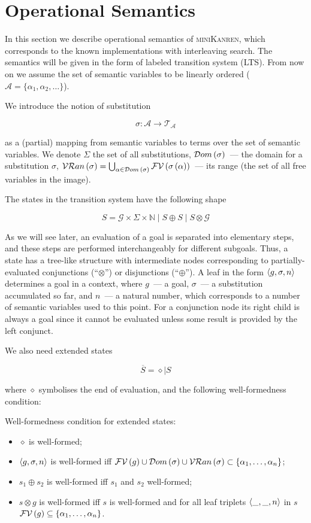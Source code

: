 \section{Operational Semantics}

In this section we describe operational semantics of \textsc{miniKanren}, which corresponds to the known
implementations with interleaving search. The semantics will be given in the form of labeled transition system (LTS). From now on we
assume the set of semantic variables to be linearly ordered ($\mathcal{A}=\{\alpha_1,\alpha_2,\dots\}$).

We introduce the notion of substitution

\[
  \sigma : \mathcal{A}\to\mathcal{T_A}
\]

as a (partial) mapping from semantic variables to terms over the set of semantic variables. We denote $\Sigma$ the
set of all substitutions, $\mathcal{D}om\,({\sigma})$~--- the domain for a substitution $\sigma$,
$\mathcal{VR}an\,({\sigma})=\bigcup_{\alpha\in\mathcal{D}om\,(\sigma)}\mathcal{FV}\,({\sigma\,(\alpha)})$~--- its range (the set of all free variables in the image).

The states in the transition system have the following shape

\[
S = \mathcal{G}\times\Sigma\times\mathbb{N}\mid S\oplus S \mid S \otimes \mathcal{G}
\]

As we will see later, an evaluation of a goal is separated into elementary steps, and these steps are performed interchangeably for different subgoals. 
Thus, a state has a tree-like structure with intermediate nodes corresponding to partially-evaluated conjunctions (``$\otimes$'') or
disjunctions (``$\oplus$''). A leaf in the form $\left<{g, \sigma, n}\right>$ determines a goal in a context, where $g$~--- a goal, $\sigma$~--- a substitution accumulated so far,
and $n$~--- a natural number, which corresponds to a number of semantic variables used to this point. For a conjunction node its right child is always a goal since
it cannot be evaluated unless some result is provided by the left conjunct.

We also need extended states

\[
\overline{S} = \diamond \mid S
\]

where $\diamond$ symbolises the end of evaluation, and the following well-formedness condition:

\begin{definition}
  Well-formedness condition for extended states:
  
  \begin{itemize}
  \item $\diamond$ is well-formed;
  \item $\left<{g, \sigma, n}\right>$ is well-formed iff $\mathcal{FV}\,({g})\cup\mathcal{D}om\,({\sigma})\cup\mathcal{VR}an\,({\sigma})\subset\{\alpha_1,\dots,\alpha_n\}$;
  \item $s_1\oplus s_2$ is well-formed iff $s_1$ and $s_2$ well-formed;
  \item $s\otimes g$ is well-formed iff $s$ is well-formed and for all leaf triplets $\left<{\_,\_,n}\right>$ in $s$ $\mathcal{FV}\,({g})\subseteq\{\alpha_1,\dots,\alpha_n\}$.
  \end{itemize}
  
\end{definition}

